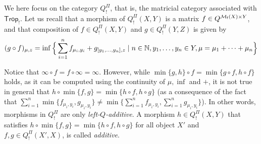 

We here focus on the category $Q^{\Pi}_{!}$, that is, the matricial category associated with $\mathsf{Trop}_{!}$. 
Let us recall that a morphism of $Q^{\Pi}_{!}(X,Y)$ is a matrix $f\in Q^{\mathcal{M}_{\mathsf f}(X)\times Y}$, and that composition of $f\in Q^{\Pi}_{!}(X,Y)$ and $g\in Q^{\Pi}_{!}(Y,Z)$ is given by 
$$
(g\circ f)_{\mu,z}= \inf\Big\{
\sum_{i=1}^{n}f_{\mu_{i},y_{i}}+
g_{[y_{1},\dots, y_{n}],z}
\mid 
n\in \mathbb{N}, 
y_{1},\dots, y_{n}\in Y,
\mu= \mu_{1}+\dots + \mu_{n}
\Big\}
$$



Notice that $\infty \circ f= f\circ \infty=\infty$. However, while $\min\{g,h\}\circ f= \min\{g\circ f, h\circ f \}$ holds, as it can be computed using the continuity of $\mu, \inf$ and $+$, it is not true in general that 
$h\circ \min\{f,g\}= \min\{h\circ f, h\circ g\}$ (as a consequence of the fact that 
$\sum_{i=1}^{n}\min\{ f_{\mu_{i},y_{i}}, g_{\mu_{i},y_{i}}\} \neq 
\min\{ \sum_{i=1}^{n} f_{\mu_{i},y_{i}}, \sum_{i=1}^{n} g_{\mu_{i},y_{i}}\}$).
In other words, morphisms in $Q^{\Pi}_{!}$ are only \emph{left-$Q$-additive}.
A morphism $h\in Q^{\Pi}_{!}(X,Y)$ that satisfies $h\circ \min\{f,g\}=\min\{h\circ f, h\circ g\}$ for all object $X'$ and $f,g\in Q^{\Pi}_{!}(X',X)$, is called \emph{additive}.

